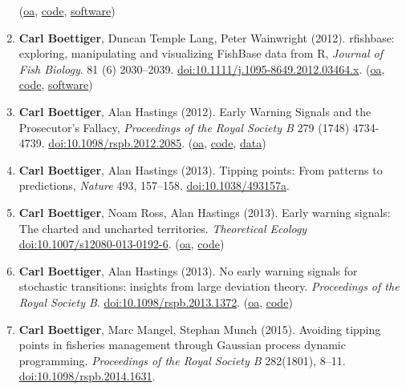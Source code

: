 \documentclass[10pt,sans]{moderncv}        %
\begin{document}
\begin{enumerate}
  (\href{https://github.com/ropensci/treebase/blob/master/inst/doc/treebase/treebase_github.md}{oa},
  \href{https://github.com/ropensci/treebase}{code},
  \href{http://cran.at.r-project.org/web/packages/treebase/}{software})
\item
  \textbf{Carl Boettiger}, Duncan Temple Lang, Peter Wainwright (2012).
  rfishbase: exploring, manipulating and visualizing FishBase data from
  R, \emph{Journal of Fish Biology}. 81 (6) 2030--2039.
  \href{http://dx.doi.org/10.1111/j.1095-8649.2012.03464.x}{doi:10.1111/j.1095-8649.2012.03464.x}.
  (\href{https://github.com/ropensci/rfishbase/blob/master/inst/doc/rfishbase/rfishbase_github.md}{oa},
  \href{https://github.com/ropensci/rfishbase}{code},
  \href{http://cran.at.r-project.org/web/packages/rfishbase/}{software})
\item
  \textbf{Carl Boettiger}, Alan Hastings (2012). Early Warning Signals
  and the Prosecutor's Fallacy, \emph{Proceedings of the Royal Society
  B} 279 (1748) 4734-4739.
  \href{http://dx.doi.org/10.1098/rspb.2012.2085}{doi:10.1098/rspb.2012.2085}.
  (\href{http://arxiv.org/abs/1210.1204}{oa},
  \href{https://github.com/cboettig/prosecutors-fallacy}{code},
  \href{http://dx.doi.org/10.5061/dryad.2k462}{data})
\item
  \textbf{Carl Boettiger}, Alan Hastings (2013). Tipping points: From
  patterns to predictions, \emph{Nature} 493, 157--158.
  \href{http://dx.doi.org/10.1038/493157a}{doi:10.1038/493157a}.
\item
  \textbf{Carl Boettiger}, Noam Ross, Alan Hastings (2013). Early
  warning signals: The charted and uncharted territories.
  \emph{Theoretical Ecology}
  \href{http://dx.doi.org/10.1007/s12080-013-0192-6}{doi:10.1007/s12080-013-0192-6}.
  (\href{http://arxiv.org/abs/1305.6700}{oa},
  \href{https://github.com/cboettig/ews-review}{code})
\item
  \textbf{Carl Boettiger}, Alan Hastings (2013). No early warning
  signals for stochastic transitions: insights from large deviation
  theory. \emph{Proceedings of the Royal Society B}.
  \href{http://dx.doi.org/10.1098/rspb.2013.1372}{doi:10.1098/rspb.2013.1372}.
  (\href{http://arxiv.org/abs/1307.4415}{oa},
  \href{https://github.com/cboettig/prosecutors-fallacy}{code})
\item
  \textbf{Carl Boettiger}, Marc Mangel, Stephan Munch (2015). Avoiding
  tipping points in fisheries management through Gaussian process
  dynamic programming. \emph{Proceedings of the Royal Society B}
  282(1801), 8--11.
  \href{http://dx.doi.org/10.1098/rspb.2014.1631}{doi:10.1098/rspb.2014.1631}.

\end{enumerate}
\end{document}
